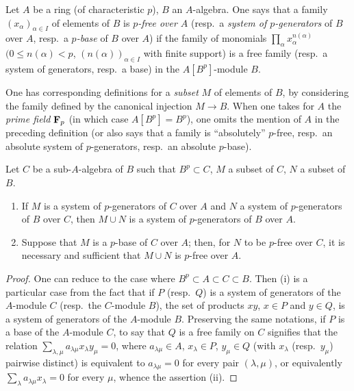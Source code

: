 \begin{definition}[21.1.9]
\label{0.21.1.9}
Let $A$ be a ring (of characteristic $p$), $B$ an $A$-algebra.
One says that a family $(x_\alpha)_{\alpha\in I}$ of elements of $B$ is \emph{$p$-free over $A$} (resp.\ a \emph{system of $p$-generators} of $B$ over $A$, resp.\ a \emph{$p$-base} of $B$ over $A$) if the family of monomials $\prod_\alpha x_\alpha^{n(\alpha)}$ $(0\leq n(\alpha)<p$, $(n(\alpha))_{\alpha\in I}$ with finite support) is a free family (resp.\ a system of generators, resp.\ a base) in the $A[B^p]$-module $B$.
\end{definition}

One has corresponding definitions for a \emph{subset} $M$ of elements of $B$, by considering the family defined by the canonical injection $M\to B$.
When one takes for $A$ the \emph{prime field} $\mathbf{F}_p$ (in which case $A[B^p]=B^p$), one omits the mention of $A$ in the preceding definition (or also says that a family is ``absolutely'' $p$-free, resp.\ an absolute system of $p$-generators, resp.\ an absolute $p$-base).

\begin{lemma}[21.1.10]
\label{0.21.1.10}
Let $C$ be a sub-$A$-algebra of $B$ such that $B^p\subset C$, $M$ a subset of $C$, $N$ a subset of $B$.
\begin{enumerate}
  \item[\rm(i)] If $M$ is a system of $p$-generators of $C$ over $A$ and $N$ a system of $p$-generators of $B$ over $C$, then $M\cup N$ is a system of $p$-generators of $B$ over $A$.
  \item[\rm(ii)] Suppose that $M$ is a $p$-base of $C$ over $A$; then, for $N$ to be $p$-free over $C$, it is necessary and sufficient that $M\cup N$ is $p$-free over $A$.
\end{enumerate}
\end{lemma}

\begin{proof}
One can reduce to the case where $B^p\subset A\subset C\subset B$.
Then (i) is a particular case from the fact that if $P$ (resp.\ $Q$) is a system of generators of the $A$-module $C$ (resp.\ the $C$-module $B$), the set of products $xy$, $x\in P$ and $y\in Q$, is a system of generators of the $A$-module $B$.
Preserving the same notations, if $P$ is a base of the $A$-module $C$, to say that $Q$ is a free family on $C$ signifies that the relation $\sum_{\lambda,\mu}a_{\lambda\mu}x_\lambda y_\mu=0$, where $a_{\lambda\mu}\in A$, $x_\lambda\in P$, $y_\mu\in Q$ (with $x_\lambda$ (resp.\ $y_\mu$) pairwise distinct) is equivalent to $a_{\lambda\mu}=0$ for every pair $(\lambda,\mu)$, or equivalently $\sum_\lambda a_{\lambda\mu}x_\lambda=0$ for every $\mu$, whence the assertion (ii).
\end{proof}

